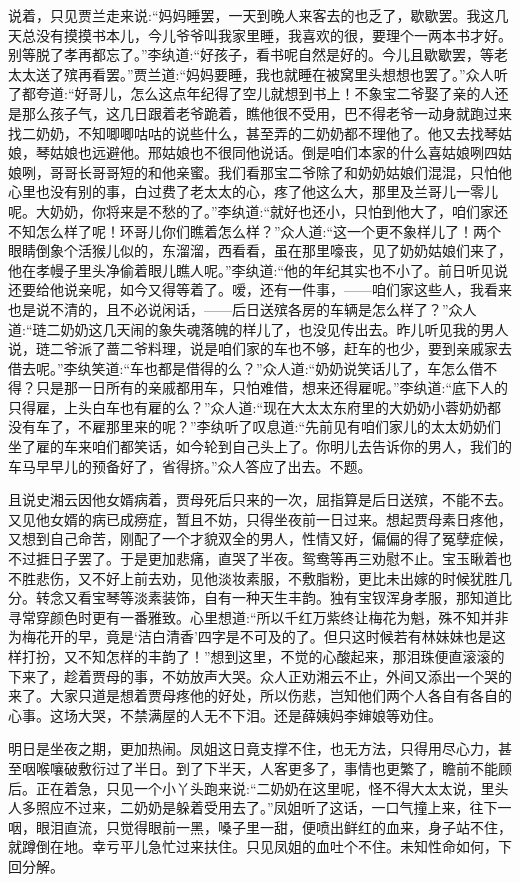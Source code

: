 \begin{parag}
    说着，只见贾兰走来说:“妈妈睡罢，一天到晚人来客去的也乏了，歇歇罢。我这几天总没有摸摸书本儿，今儿爷爷叫我家里睡，我喜欢的很，要理个一两本书才好。别等脱了孝再都忘了。”李纨道:“好孩子，看书呢自然是好的。今儿且歇歇罢，等老太太送了殡再看罢。”贾兰道:“妈妈要睡，我也就睡在被窝里头想想也罢了。”众人听了都夸道:“好哥儿，怎么这点年纪得了空儿就想到书上！不象宝二爷娶了亲的人还是那么孩子气，这几日跟着老爷跪着，瞧他很不受用，巴不得老爷一动身就跑过来找二奶奶，不知唧唧咕咕的说些什么，甚至弄的二奶奶都不理他了。他又去找琴姑娘，琴姑娘也远避他。邢姑娘也不很同他说话。倒是咱们本家的什么喜姑娘咧四姑娘咧，哥哥长哥哥短的和他亲蜜。我们看那宝二爷除了和奶奶姑娘们混混，只怕他心里也没有别的事，白过费了老太太的心，疼了他这么大，那里及兰哥儿一零儿呢。大奶奶，你将来是不愁的了。”李纨道:“就好也还小，只怕到他大了，咱们家还不知怎么样了呢！环哥儿你们瞧着怎么样？”众人道:“这一个更不象样儿了！两个眼睛倒象个活猴儿似的，东溜溜，西看看，虽在那里嚎丧，见了奶奶姑娘们来了，他在孝幔子里头净偷着眼儿瞧人呢。”李纨道:“他的年纪其实也不小了。前日听见说还要给他说亲呢，如今又得等着了。嗳，还有一件事，——咱们家这些人，我看来也是说不清的，且不必说闲话，——后日送殡各房的车辆是怎么样了？”众人道:“琏二奶奶这几天闹的象失魂落魄的样儿了，也没见传出去。昨儿听见我的男人说，琏二爷派了蔷二爷料理，说是咱们家的车也不够，赶车的也少，要到亲戚家去借去呢。”李纨笑道:“车也都是借得的么？”众人道:“奶奶说笑话儿了，车怎么借不得？只是那一日所有的亲戚都用车，只怕难借，想来还得雇呢。”李纨道:“底下人的只得雇，上头白车也有雇的么？”众人道:“现在大太太东府里的大奶奶小蓉奶奶都没有车了，不雇那里来的呢？”李纨听了叹息道:“先前见有咱们家儿的太太奶奶们坐了雇的车来咱们都笑话，如今轮到自己头上了。你明儿去告诉你的男人，我们的车马早早儿的预备好了，省得挤。”众人答应了出去。不题。
\end{parag}


\begin{parag}
    且说史湘云因他女婿病着，贾母死后只来的一次，屈指算是后日送殡，不能不去。又见他女婿的病已成痨症，暂且不妨，只得坐夜前一日过来。想起贾母素日疼他，又想到自己命苦，刚配了一个才貌双全的男人，性情又好，偏偏的得了冤孽症候，不过捱日子罢了。于是更加悲痛，直哭了半夜。鸳鸯等再三劝慰不止。宝玉瞅着也不胜悲伤，又不好上前去劝，见他淡妆素服，不敷脂粉，更比未出嫁的时候犹胜几分。转念又看宝琴等淡素装饰，自有一种天生丰韵。独有宝钗浑身孝服，那知道比寻常穿颜色时更有一番雅致。心里想道:“所以千红万紫终让梅花为魁，殊不知并非为梅花开的早，竟是‘洁白清香’四字是不可及的了。但只这时候若有林妹妹也是这样打扮，又不知怎样的丰韵了！”想到这里，不觉的心酸起来，那泪珠便直滚滚的下来了，趁着贾母的事，不妨放声大哭。众人正劝湘云不止，外间又添出一个哭的来了。大家只道是想着贾母疼他的好处，所以伤悲，岂知他们两个人各自有各自的心事。这场大哭，不禁满屋的人无不下泪。还是薛姨妈李婶娘等劝住。
\end{parag}


\begin{parag}
    明日是坐夜之期，更加热闹。凤姐这日竟支撑不住，也无方法，只得用尽心力，甚至咽喉嚷破敷衍过了半日。到了下半天，人客更多了，事情也更繁了，瞻前不能顾后。正在着急，只见一个小丫头跑来说:“二奶奶在这里呢，怪不得大太太说，里头人多照应不过来，二奶奶是躲着受用去了。”凤姐听了这话，一口气撞上来，往下一咽，眼泪直流，只觉得眼前一黑，嗓子里一甜，便喷出鲜红的血来，身子站不住，就蹲倒在地。幸亏平儿急忙过来扶住。只见凤姐的血吐个不住。未知性命如何，下回分解。
\end{parag}